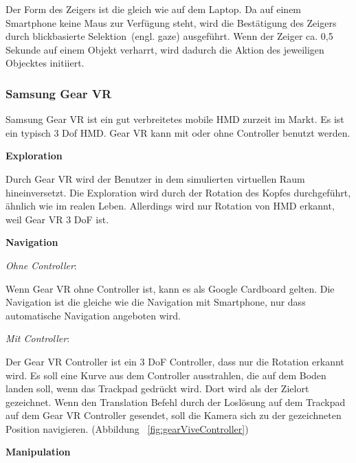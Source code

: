   \noindent
  Der Form des Zeigers ist die gleich wie auf dem Laptop. Da auf einem Smartphone keine Maus zur Verfügung steht, wird die Bestätigung des Zeigers durch \glqq blickbasierte Selektion\grqq\ (engl. gaze) ausgeführt. Wenn der Zeiger ca. 0,5 Sekunde auf einem Objekt verharrt, wird dadurch die Aktion des jeweiligen Objecktes initiiert.
  
 \subsubsection{Samsung Gear VR}
 Samsung Gear VR ist ein gut verbreitetes mobile HMD zurzeit im Markt. Es ist ein typisch 3 Dof HMD. Gear VR kann mit oder ohne Controller benutzt werden.
 
  \vspace{1em}
  \noindent
  \textbf{Exploration}
  \vspace{1em}
  
  \noindent
  Durch Gear VR wird der Benutzer in dem simulierten virtuellen Raum hineinversetzt. Die Exploration wird durch der Rotation des Kopfes durchgeführt, ähnlich wie im realen Leben. Allerdings wird nur Rotation von HMD erkannt, weil Gear VR 3 DoF ist.
  
  \vspace{1em}
  \noindent
  \textbf{Navigation}
  \vspace{1em}
  
  \noindent
  \textsl{Ohne Controller}:
  \vspace{0.5em}
  
  \noindent
  Wenn Gear VR ohne Controller ist, kann es als Google Cardboard gelten. Die Navigation ist die gleiche wie die Navigation mit Smartphone, nur dass automatische Navigation angeboten wird.
 
  \vspace{0.5em}
  \noindent
  \textsl{Mit Controller}:
  \vspace{0.5em}
  
  \noindent
  Der Gear VR Controller ist ein 3 DoF Controller, dass nur die Rotation erkannt wird. Es soll eine Kurve aus dem Controller ausstrahlen, die auf dem Boden landen soll, wenn das Trackpad gedrückt wird. Dort wird als der Zielort gezeichnet. Wenn den Translation Befehl durch der Loslösung auf dem Trackpad auf dem Gear VR Controller gesendet, soll die Kamera sich zu der gezeichneten Position navigieren. (Abbildung ~\ref{fig:gearViveController})

  \vspace{1em}
  \noindent
  \textbf{Manipulation}
  \vspace{1em}
  

